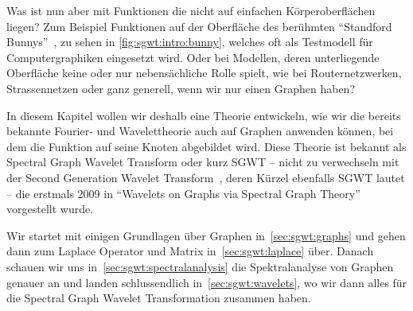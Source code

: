 Was ist nun aber mit Funktionen die nicht auf einfachen K\"orperoberfl\"achen 
liegen? Zum Beispiel Funktionen auf der Oberfl\"ache des ber\"uhmten 
``Standford Bunnys''~\cite{noauthor_stanford_nodate}, zu sehen in 
\cref{fig:sgwt:intro:bunny}, welches oft als Testmodell f\"ur Computergraphiken 
eingesetzt wird. Oder bei Modellen, deren unterliegende Oberfl\"ache keine oder 
nur nebens\"achliche Rolle spielt, wie bei Routernetzwerken, Strassennetzen 
oder ganz generell, wenn wir nur einen Graphen haben?

In diesem Kapitel wollen wir deshalb eine Theorie entwickeln, wie 
wir die bereits bekannte Fourier- und Wavelettheorie auch auf Graphen anwenden 
k\"onnen, bei dem die Funktion auf seine Knoten abgebildet wird. Diese Theorie 
ist bekannt als Spectral Graph Wavelet Transform oder kurz SGWT -- nicht zu 
verwechseln mit der Second Generation Wavelet 
Transform~\cite{noauthor_second-generation_2018}, deren K\"urzel ebenfalls SGWT 
lautet -- die erstmals 2009 in ``Wavelets on Graphs via Spectral Graph 
Theory''~\cite{hammond_wavelets_2009} vorgestellt wurde.

Wir startet mit einigen Grundlagen \"uber Graphen in~\cref{sec:sgwt:graphs} und 
gehen dann zum Laplace Operator und Matrix in~\cref{sec:sgwt:laplace} \"uber. 
Danach schauen wir uns in~\cref{sec:sgwt:spectralanalysis} die Spektralanalyse 
von Graphen genauer an und landen schlussendlich in~\cref{sec:sgwt:wavelets}, 
wo wir dann alles f\"ur die Spectral Graph Wavelet Transformation zusammen 
haben.
